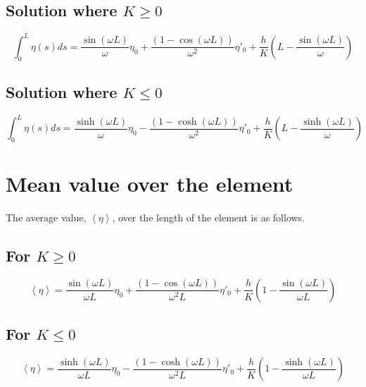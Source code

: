 \documentclass[]{article}
\begin{document}
  \subsection{Solution where $K\geq 0$}
  \begin{equation}
    \displaystyle\int_{0}^{L}\eta\left(s\right)ds = \frac{\sin\left(\omega L\right)}{\omega}\eta_0
                + \frac{\left(1 - \cos\left(\omega L\right)\right)}{\omega^2}\eta'_0
                + \frac{h}{K}\left(L - \frac{\sin\left(\omega L\right)}{\omega}\right)
    \label{eq:K_pos_integ}
  \end{equation}

  \subsection{Solution where $K\leq 0$}
  \begin{equation}
    \displaystyle\int_{0}^{L}\eta\left(s\right)ds = \frac{\sinh\left(\omega L\right)}{\omega}\eta_0
                - \frac{\left(1 - \cosh\left(\omega L\right)\right)}{\omega^2}\eta'_0
                + \frac{h}{K}\left(L - \frac{\sinh\left(\omega L\right)}{\omega}\right)
    \label{eq:K_neg_integ}
  \end{equation}

  \section{Mean value over the element}
  The average value, $\left<\eta\right>$, over the length of the element is as follows.
  
  \subsection{For $K\geq 0$}
  \begin{equation}
    \left<\eta\right> = \frac{\sin\left(\omega L\right)}{\omega L}\eta_0
                + \frac{\left(1 - \cos\left(\omega L\right)\right)}{\omega^2 L}\eta'_0
                + \frac{h}{K}\left(1 - \frac{\sin\left(\omega L\right)}{\omega L}\right)
    \label{eq:K_pos_mean}
  \end{equation}

  \subsection{For $K\leq 0$}
  \begin{equation}
    \left<\eta\right> = \frac{\sinh\left(\omega L\right)}{\omega L}\eta_0
                - \frac{\left(1 - \cosh\left(\omega L\right)\right)}{\omega^2 L}\eta'_0
                + \frac{h}{K}\left(1 - \frac{\sinh\left(\omega L\right)}{\omega L}\right)
    \label{eq:K_neg_mean}
  \end{equation}
\end{document}

